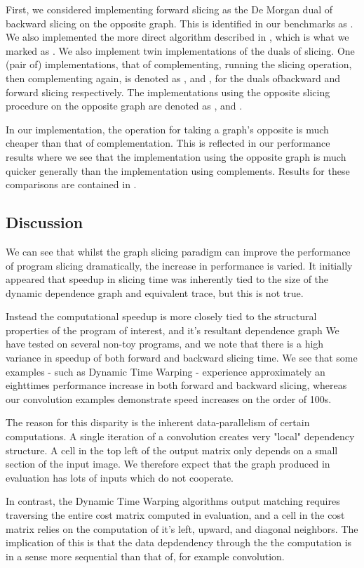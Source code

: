 First, we considered implementing forward slicing as the De Morgan dual of backward
slicing on the opposite graph. This is identified in our benchmarks as \NaiveFwd.
We also implemented the more direct algorithm described in , which
is what we marked as \GraphFwd. We also implement twin implementations of the
duals of slicing. One (pair of) implementations, that of complementing, running the slicing
operation, then complementing again, is denoted as \GraphBwdCmp, and \GraphFwdCmp,
for the duals ofbackward and forward slicing respectively. The implementations
using the opposite slicing procedure on the opposite graph are denoted as
\GraphBwdOp, and \GraphFwdOp.

In our implementation, the operation for taking a graph's opposite is much
cheaper than that of complementation. This is reflected in our performance
results where we see that the implementation using the opposite graph is much
quicker generally than the implementation using complements. Results for these
comparisons are contained in .

{\tiny}

\subsection{Discussion}
We can see that whilst the graph slicing paradigm can improve the performance
of program slicing dramatically, the increase in performance is varied. It
initially appeared that speedup in slicing time was inherently tied to the
size of the dynamic dependence graph and equivalent trace, but this is not true.

Instead the computational speedup is more closely tied to the structural
properties of the program of interest, and it's resultant dependence graph
We have tested on several non-toy programs, and we note that there is a
high variance in speedup of both forward and backward slicing time. We see that
some examples - such as Dynamic Time Warping - experience approximately an
eighttimes performance increase in both forward and backward slicing, whereas
our convolution examples demonstrate speed increases on the order of 100s.

The reason for this disparity is the inherent data-parallelism of certain
computations. A single iteration of a convolution creates very "local" dependency
structure. A cell in the top left of the output matrix only depends on a small
section of the input image. We therefore expect that the graph produced
in evaluation has lots of inputs which do not cooperate.

In contrast, the Dynamic Time Warping algorithms output matching
requires traversing the entire cost matrix computed in evaluation, and a cell in
the cost matrix relies on the computation of it's left, upward, and diagonal
neighbors. The implication of this is that the data depdendency through the
the computation is in a sense more sequential than that of, for example
convolution.
{\tiny{}
}
